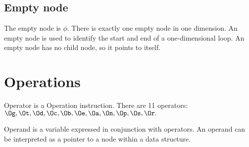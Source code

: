 \subsection{Empty node}
The empty node is \(\phi\). There is exactly one empty node in one dimension. An empty node is used to identify the start and end of a one-dimensional loop. An empty node has no child node, so it points to itself.



\bigskip
\bigskip
\section{Operations}
Operator is a Operation instruction. There are 11 operators:\\
\( \Og, \Ot, \Od, \Oc, \Ob, \Oe, \Oa, \On, \Op, \Os, \Or.\)


Operand is a variable expressed in conjunction with operators. An operand can be interpreted as a pointer to a node within a data structure.


